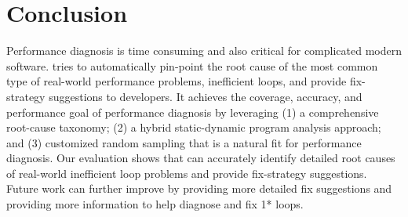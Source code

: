 \section{Conclusion}
\label{sec:con}
Performance diagnosis is time consuming and also critical for 
complicated modern software. \Tool tries to automatically 
pin-point the root cause of
the most common type of real-world performance problems, inefficient loops,
and provide fix-strategy suggestions to developers. It achieves the 
coverage, accuracy, and performance goal of performance diagnosis by leveraging
(1) a comprehensive root-cause taxonomy; (2) a hybrid static-dynamic program
analysis approach; and (3) customized random sampling that is a natural fit for 
performance diagnosis.
Our evaluation shows that \Tool can accurately identify detailed root causes
of real-world inefficient loop problems and provide fix-strategy suggestions. 
Future work can further improve \Tool by providing more detailed fix
suggestions and providing more information to help diagnose and fix
1* loops.


